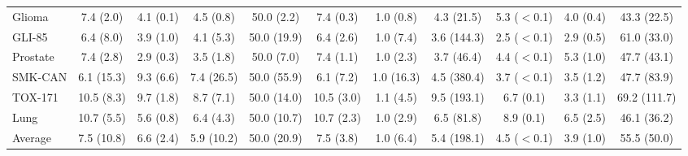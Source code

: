 \begin{table}[!t]
\begin{tabular*}{\textwidth}{@{\extracolsep{\fill}}lcccccccccc@{}}
Glioma & 7.4 (2.0) & 4.1 (0.1) & 4.5 (0.8) & 50.0 (2.2) & 7.4 (0.3) & 1.0 (0.8) & 4.3 (21.5) & 5.3 ($<$0.1) & 4.0 (0.4) & 43.3 (22.5) \\
GLI-85 & 6.4 (8.0) & 3.9 (1.0) & 4.1 (5.3) & 50.0 (19.9) & 6.4 (2.6) & 1.0 (7.4) & 3.6 (144.3) & 2.5 ($<$0.1) & 2.9 (0.5) & 61.0 (33.0) \\
Prostate & 7.4 (2.8) & 2.9 (0.3) & 3.5 (1.8) & 50.0 (7.0) & 7.4 (1.1) & 1.0 (2.3) & 3.7 (46.4) & 4.4 ($<$0.1) & 5.3 (1.0) & 47.7 (43.1) \\
SMK-CAN & 6.1 (15.3) & 9.3 (6.6) & 7.4 (26.5) & 50.0 (55.9) & 6.1 (7.2) & 1.0 (16.3) & 4.5 (380.4) & 3.7 ($<$0.1) & 3.5 (1.2) & 47.7 (83.9) \\
TOX-171 & 10.5 (8.3) & 9.7 (1.8) & 8.7 (7.1) & 50.0 (14.0) & 10.5 (3.0) & 1.1 (4.5) & 9.5 (193.1) & 6.7 (0.1) & 3.3 (1.1) & 69.2 (111.7) \\
Lung & 10.7 (5.5) & 5.6 (0.8) & 6.4 (4.3) & 50.0 (10.7) & 10.7 (2.3) & 1.0 (2.9) & 6.5 (81.8) & 8.9 (0.1) & 6.5 (2.5) & 46.1 (36.2) \\
\midrule
Average & 7.5 (10.8) & 6.6 (2.4) & 5.9 (10.2) & 50.0 (20.9) & 7.5 (3.8) & 1.0 (6.4) & 5.4 (198.1) & 4.5 ($<$0.1) & 3.9 (1.0) & 55.5 (50.0) \\
\bottomrule
\end{tabular*}
\end{table}
